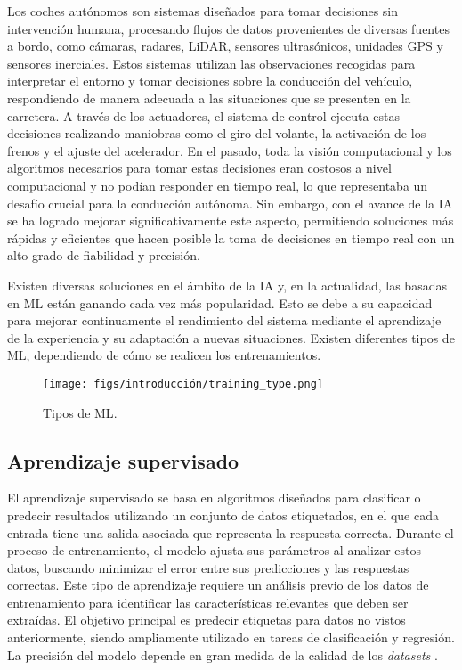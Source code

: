 Los coches autónomos son sistemas diseñados para tomar decisiones sin intervención humana, procesando flujos de datos provenientes de diversas fuentes a bordo, como cámaras, radares, \ac{LiDAR}, sensores ultrasónicos, unidades \ac{GPS} y sensores inerciales. Estos sistemas utilizan las observaciones recogidas para interpretar el entorno y tomar decisiones sobre la conducción del vehículo, respondiendo de manera adecuada a las situaciones que se presenten en la carretera. A través de los actuadores, el sistema de control ejecuta estas decisiones realizando maniobras como el giro del volante, la activación de los frenos y el ajuste del acelerador. En el pasado, toda la visión computacional y los algoritmos necesarios para tomar estas decisiones eran costosos a nivel computacional y no podían responder en tiempo real, lo que representaba un desafío crucial para la conducción autónoma. Sin embargo, con el avance de la \ac{IA} se ha logrado mejorar significativamente este aspecto, permitiendo soluciones más rápidas y eficientes que hacen posible la toma de decisiones en tiempo real con un alto grado de fiabilidad y precisión.

Existen diversas soluciones en el ámbito de la \ac{IA} y, en la actualidad, las basadas en \ac{ML} están ganando cada vez más popularidad. Esto se debe a su capacidad para mejorar continuamente el rendimiento del sistema mediante el aprendizaje de la experiencia y su adaptación a nuevas situaciones. Existen diferentes tipos de \ac{ML}, dependiendo de cómo se realicen los entrenamientos.

\begin{figure}[ht]
  \begin{center}
    \texttt{[image: figs/introducción/training\_type.png]}
  \end{center}
  \caption{Tipos de \ac{ML}.}
  \label{ml}
\end{figure}

\subsection{Aprendizaje supervisado}

El aprendizaje supervisado se basa en algoritmos diseñados para clasificar o predecir resultados utilizando un conjunto de datos etiquetados, en el que cada entrada tiene una salida asociada que representa la respuesta correcta. Durante el proceso de entrenamiento, el modelo ajusta sus parámetros al analizar estos datos, buscando minimizar el error entre sus predicciones y las respuestas correctas. Este tipo de aprendizaje requiere un análisis previo de los datos de entrenamiento para identificar las características relevantes que deben ser extraídas. El objetivo principal es predecir etiquetas para datos no vistos anteriormente, siendo ampliamente utilizado en tareas de clasificación y regresión. La precisión del modelo depende en gran medida de la calidad de los \textit{datasets} \cite{supervised-learning}.

